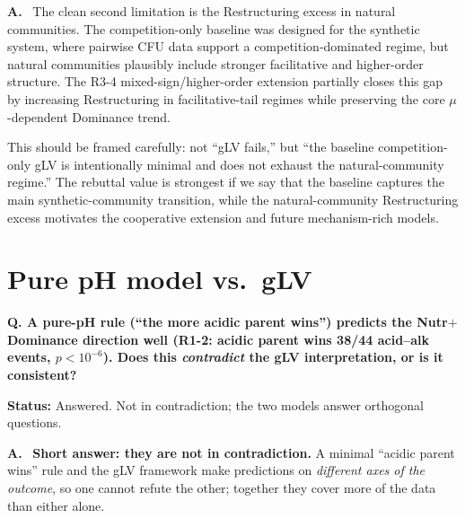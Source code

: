 \documentclass[11pt]{article}
\newcommand{\question}[1]{%
    \par\vspace{0.4em}\noindent%
    {\color{blue!70!black}\textbf{Q. #1}}\par\smallskip%
}
\newcommand{\answerlabel}{\par\noindent\textbf{A.}\ }
\newcommand{\statusmark}[1]{{\color{red!70!black}\textbf{Status:} #1}\par}
\begin{document}
\answerlabel
The clean second limitation is the Restructuring excess in natural communities. The competition-only baseline was designed for the synthetic system, where pairwise CFU data support a competition-dominated regime, but natural communities plausibly include stronger facilitative and higher-order structure. The R3-4 mixed-sign/higher-order extension partially closes this gap by increasing Restructuring in facilitative-tail regimes while preserving the core $\mu$-dependent Dominance trend.

This should be framed carefully: not ``gLV fails,'' but ``the baseline competition-only gLV is intentionally minimal and does not exhaust the natural-community regime.'' The rebuttal value is strongest if we say that the baseline captures the main synthetic-community transition, while the natural-community Restructuring excess motivates the cooperative extension and future mechanism-rich models.

\section{Pure pH model vs.\ gLV}
\label{sec:q3_pH_vs_gLV}

\question{A pure-pH rule (``the more acidic parent wins'') predicts the Nutr$+$ Dominance direction well (R1-2: acidic parent wins 38/44 acid--alk events, $p < 10^{-6}$). Does this \emph{contradict} the gLV interpretation, or is it consistent?}
\statusmark{Answered. Not in contradiction; the two models answer orthogonal questions.}

\answerlabel
\textbf{Short answer: they are not in contradiction.} A minimal ``acidic parent wins'' rule and the gLV framework make predictions on \emph{different axes of the outcome}, so one cannot refute the other; together they cover more of the data than either alone.
\end{document}
